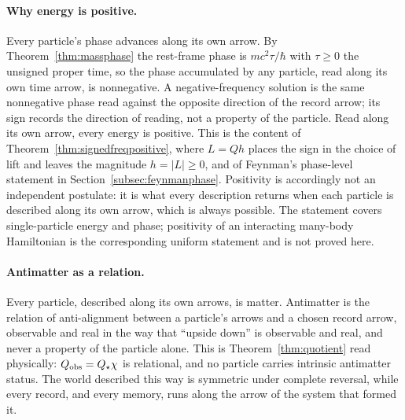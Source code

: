 \documentclass[11pt]{article}
\theoremstyle{definition}\newtheorem{definition}[theorem]{Definition}
\theoremstyle{remark}\newtheorem{remark}[theorem]{Remark}\newtheorem{conjecture}[theorem]{Conjecture}
\begin{document}
\paragraph{Why energy is positive.} Every particle's phase advances along its own arrow. By Theorem~\ref{thm:massphase} the rest-frame phase is $mc^2\tau/\hbar$ with $\tau\ge0$ the unsigned proper time, so the phase accumulated by any particle, read along its own time arrow, is nonnegative. A negative-frequency solution is the same nonnegative phase read against the opposite direction of the record arrow; its sign records the direction of reading, not a property of the particle. Read along its own arrow, every energy is positive. This is the content of Theorem~\ref{thm:signedfreqpositive}, where $L=Qh$ places the sign in the choice of lift and leaves the magnitude $h=|L|\ge0$, and of Feynman's phase-level statement in Section~\ref{subsec:feynmanphase}. Positivity is accordingly not an independent postulate: it is what every description returns when each particle is described along its own arrow, which is always possible. The statement covers single-particle energy and phase; positivity of an interacting many-body Hamiltonian is the corresponding uniform statement and is not proved here.

\paragraph{Antimatter as a relation.} Every particle, described along its own arrows, is matter. Antimatter is the relation of anti-alignment between a particle's arrows and a chosen record arrow, observable and real in the way that ``upside down'' is observable and real, and never a property of the particle alone. This is Theorem~\ref{thm:quotient} read physically: $Q_{\rm obs}=Q_\star\chi$ is relational, and no particle carries intrinsic antimatter status. The world described this way is symmetric under complete reversal, while every record, and every memory, runs along the arrow of the system that formed it.
\end{document}
